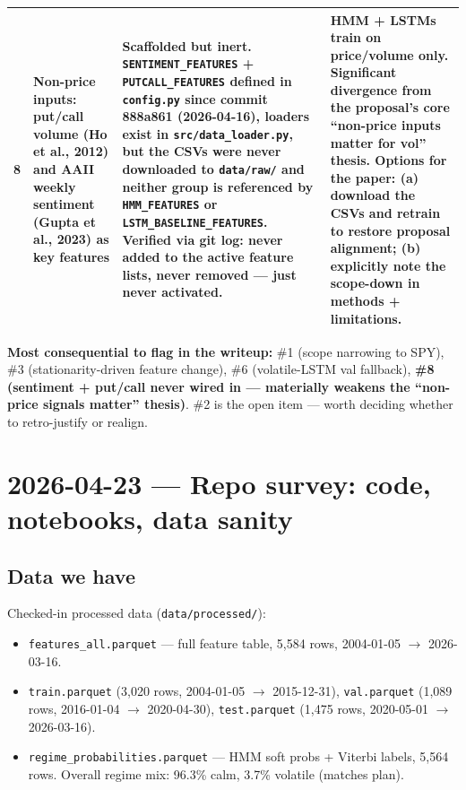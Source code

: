 \documentclass[11pt]{article}
\begin{document}
\begin{center}
\begin{tabular}{@{}c p{3.4cm} p{4.4cm} p{5.8cm}@{}}
8 & Non-price inputs: put/call volume (Ho et al., 2012) and AAII weekly sentiment (Gupta et al., 2023) as key features & \textbf{Scaffolded but inert.} \texttt{SENTIMENT\_FEATURES} + \texttt{PUTCALL\_FEATURES} defined in \texttt{config.py} since commit 888a861 (2026-04-16), loaders exist in \texttt{src/data\_loader.py}, but the CSVs were never downloaded to \texttt{data/raw/} and neither group is referenced by \texttt{HMM\_FEATURES} or \texttt{LSTM\_BASELINE\_FEATURES}. Verified via git log: never added to the active feature lists, never removed --- just never activated. & HMM + LSTMs train on price/volume only. Significant divergence from the proposal's core ``non-price inputs matter for vol'' thesis. Options for the paper: (a) download the CSVs and retrain to restore proposal alignment; (b) explicitly note the scope-down in methods + limitations. \\
\bottomrule
\end{tabular}
\end{center}

\textbf{Most consequential to flag in the writeup:} \#1 (scope narrowing to SPY), \#3 (stationarity-driven feature change), \#6 (volatile-LSTM val fallback), \textbf{\#8 (sentiment + put/call never wired in --- materially weakens the ``non-price signals matter'' thesis)}. \#2 is the open item --- worth deciding whether to retro-justify or realign.

\hrulefill

\section*{2026-04-23 --- Repo survey: code, notebooks, data sanity}

\subsection*{Data we have}

Checked-in processed data (\texttt{data/processed/}):

\begin{itemize}[leftmargin=*]
  \item \texttt{features\_all.parquet} --- full feature table, 5{,}584 rows, 2004-01-05 $\to$ 2026-03-16.
  \item \texttt{train.parquet} (3{,}020 rows, 2004-01-05 $\to$ 2015-12-31), \texttt{val.parquet} (1{,}089 rows, 2016-01-04 $\to$ 2020-04-30), \texttt{test.parquet} (1{,}475 rows, 2020-05-01 $\to$ 2026-03-16).
  \item \texttt{regime\_probabilities.parquet} --- HMM soft probs + Viterbi labels, 5{,}564 rows. Overall regime mix: 96.3\% calm, 3.7\% volatile (matches plan).
\end{itemize}
\end{document}
